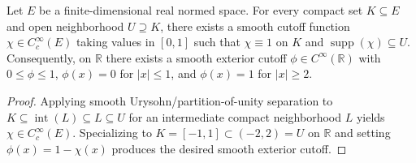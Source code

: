 \begin{theorem}\label{thm:exists_smooth_cutoffs}
\leanok
Let $E$ be a finite-dimensional real normed space. For every compact set $K \subseteq E$ and open neighborhood $U \supseteq K$, there exists a smooth cutoff function $\chi \in C_c^\infty(E)$ taking values in $[0, 1]$ such that $\chi \equiv 1$ on $K$ and $\operatorname{supp}(\chi) \subseteq U$. Consequently, on $\mathbb{R}$ there exists a smooth exterior cutoff $\phi \in C^\infty(\mathbb{R})$ with $0 \le \phi \le 1$, $\phi(x) = 0$ for $\lvert x \rvert \le 1$, and $\phi(x) = 1$ for $\lvert x \rvert \ge 2$.
\end{theorem}

\begin{proof}
\leanok
Applying smooth Urysohn/partition-of-unity separation to $K \subseteq \operatorname{int}(L) \subseteq L \subseteq U$ for an intermediate compact neighborhood $L$ yields $\chi \in C_c^\infty(E)$. Specializing to $K = [-1, 1] \subset (-2, 2) = U$ on $\mathbb{R}$ and setting $\phi(x) = 1 - \chi(x)$ produces the desired smooth exterior cutoff.
\end{proof}
